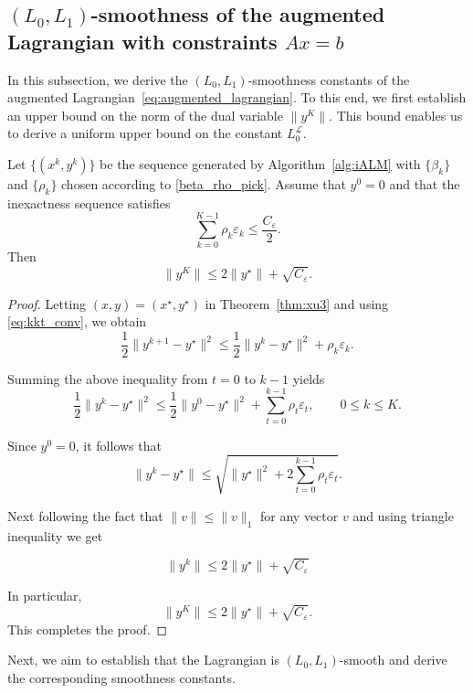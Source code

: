 \documentclass[runningheads]{llncs}
\begin{document}
	\subsection{$(L_0,L_1)$-smoothness of the augmented Lagrangian with constraints $Ax=b$}\label{smoothness_al}
	
	In this subsection, we derive the $(L_0,L_1)$-smoothness constants of the augmented Lagrangian~\eqref{eq:augmented_lagrangian}. To this end, we first establish an upper bound on the norm of the dual variable $\|y^K\|$. This bound enables us to derive a uniform upper bound on the constant $L_0^{\mathcal{L}}$.
		
	\begin{lemma}\label{lem:y_bnd}
		Let $\{(x^k,y^k)\}$ be the sequence generated by Algorithm~\ref{alg:iALM} with $\{\beta_k\}$ and $\{\rho_k\}$ chosen according to \eqref{beta_rho_pick}. Assume that $y^0=0$ and that the inexactness sequence satisfies
		\[
		\sum_{k=0}^{K-1}\rho_k\varepsilon_k
		\leq
		\frac{C_\varepsilon}{2}.
		\]
		Then
		\[
		\|y^K\|
		\leq
		2\|y^\star\|
		+
		\sqrt{C_\varepsilon}.
		\]
	\end{lemma}
	
	\begin{proof}
		Letting $(x,y)=(x^\star,y^\star)$ in Theorem~\ref{thm:xu3} and using \eqref{eq:kkt_conv}, we obtain
		\[
		\frac{1}{2}\|y^{k+1}-y^\star\|^2
		\leq
		\frac{1}{2}\|y^{k}-y^\star\|^2
		+
		\rho_k\varepsilon_k .
		\]
		
		Summing the above inequality from $t=0$ to $k-1$ yields
		\[
		\frac{1}{2}\|y^{k}-y^\star\|^2
		\leq
		\frac{1}{2}\|y^{0}-y^\star\|^2
		+
		\sum_{t=0}^{k-1}\rho_t\varepsilon_t ,
		\qquad
		0\leq k\leq K.
		\]
		
		Since $y^0=0$, it follows that
		\[
		\|y^{k}-y^\star\|
		\leq
		\sqrt{
			\|y^\star\|^2
			+
			2\sum_{t=0}^{k-1}\rho_t\varepsilon_t
		}.
		\]
		
		Next following the fact that $\| v \| \leq \| v \|_1$ for any vector $v$ and using triangle inequality we get
		
		\[
		\|y^{k}\| \leq 2 \|y^\star\| + \sqrt{C_\varepsilon}
		\]
		
		In particular,
		\[
		\|y^K\| \leq 2\|y^\star\| + \sqrt{C_\varepsilon}.
		\]
		This completes the proof.
	\end{proof}
	
	Next, we aim to establish that the Lagrangian is $(L_0,L_1)$-smooth and derive the corresponding smoothness constants.
	
\end{document}
